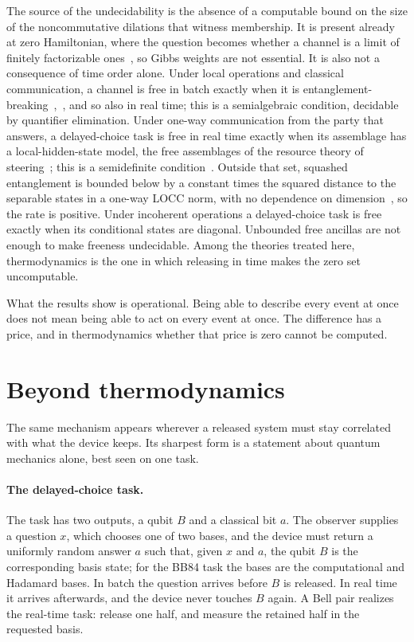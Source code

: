 \documentclass[11pt]{article}
\theoremstyle{definition}
\theoremstyle{remark}
\begin{document}
The source of the undecidability is the absence of a computable bound on the size of the noncommutative dilations that witness membership. It is present already at zero Hamiltonian, where the question becomes whether a channel is a limit of finitely factorizable ones~\cite{Memory}, so Gibbs weights are not essential. It is also not a consequence of time order alone. Under local operations and classical communication, a channel is free in batch exactly when it is entanglement-breaking~\cite{HSR03},~\cite[Cor.~18]{BBCW13}, and so also in real time; this is a semialgebraic condition, decidable by quantifier elimination. Under one-way communication from the party that answers, a delayed-choice task is free in real time exactly when its assemblage has a local-hidden-state model, the free assemblages of the resource theory of steering~\cite{GallegoAolita15}; this is a semidefinite condition~\cite{CavalcantiSkrzypczyk17}. Outside that set, squashed entanglement is bounded below by a constant times the squared distance to the separable states in a one-way LOCC norm, with no dependence on dimension~\cite{BCY11}, so the rate is positive. Under incoherent operations a delayed-choice task is free exactly when its conditional states are diagonal. Unbounded free ancillas are not enough to make freeness undecidable. Among the theories treated here, thermodynamics is the one in which releasing in time makes the zero set uncomputable.

What the results show is operational. Being able to describe every event at once does not mean being able to act on every event at once. The difference has a price, and in thermodynamics whether that price is zero cannot be computed.

\section{Beyond thermodynamics}\label{sec:beyond}

The same mechanism appears wherever a released system must stay correlated with what the device keeps. Its sharpest form is a statement about quantum mechanics alone, best seen on one task.

\paragraph{The delayed-choice task.} The task has two outputs, a qubit $B$ and a classical bit $a$. The observer supplies a question $x$, which chooses one of two bases, and the device must return a uniformly random answer $a$ such that, given $x$ and $a$, the qubit $B$ is the corresponding basis state; for the BB84 task the bases are the computational and Hadamard bases. In batch the question arrives before $B$ is released. In real time it arrives afterwards, and the device never touches $B$ again. A Bell pair realizes the real-time task: release one half, and measure the retained half in the requested basis.
\end{document}
